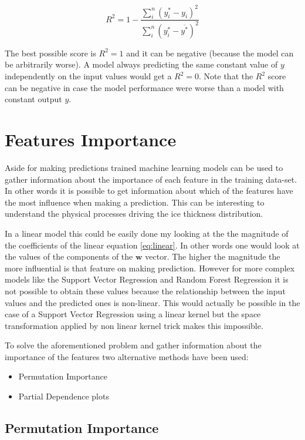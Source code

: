 \begin{equation}\label{eq:score}
R^2 = 1 - \frac{\sum_{i}^{n}(y^*_i-y_i)^2}{\sum_{i}^{n}(y^*_i-\overline{y^*})^2}
\end{equation}

The best possible score is $R^2 = 1$ and it can be negative (because the model can be arbitrarily worse). A model always predicting the same constant value of $y$ independently on the input values would get a $R^2 = 0$. Note that the $R^2$ score can be negative in case the model performance were worse than a model with constant output $y$.

\section{Features Importance}\label{featuresimp}
Aside for making predictions trained machine learning models can be used to gather information about the importance of each feature in the training data-set. In other words it is possible to get information about which of the features have the most influence when making a prediction. This can be interesting to understand the physical processes driving the ice thickness distribution.

In a linear model this could be easily done my looking at the the magnitude of the coefficients of the linear equation \ref{eq:linear}. In other words one would look at the values of the components of the $\mathbf{w}$ vector. The higher the magnitude the more influential is that feature on making prediction.
However for more complex models like the Support Vector Regression and Random Forest Regression it is not possible to obtain these values because the relationship between the input values and the predicted ones is non-linear. This would actually be possible in the case of a Support Vector Regression using a linear kernel but the space transformation applied by non linear kernel trick makes this impossible.

To solve the aforementioned problem and gather information about the importance of the features two alternative methods have been used:
\begin{itemize}
	\item Permutation Importance
	\item Partial Dependence plots
\end{itemize} 

\subsection{Permutation Importance}\label{permutation}

